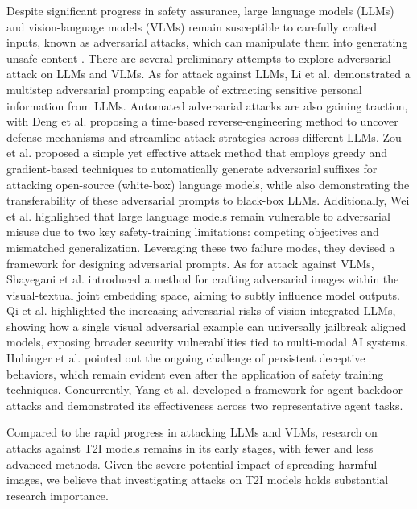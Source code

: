 Despite significant progress in safety assurance, large language models (LLMs) and vision-language models (VLMs) remain susceptible to carefully crafted inputs, known as adversarial attacks, which can manipulate them into generating unsafe content \cite{liu2023jailbreaking,tu2025many}. There are several preliminary attempts to explore adversarial attack on LLMs and VLMs.
As for attack against LLMs, Li et al. \cite{li2023multi} demonstrated a multistep adversarial prompting capable of extracting sensitive personal information from LLMs. 
Automated adversarial attacks are also gaining traction, with Deng et al. \cite{deng2023jailbreaker} proposing a time-based reverse-engineering method to uncover defense mechanisms and streamline attack strategies across different LLMs.
Zou et al. \cite{zou2023universal} proposed a simple yet effective attack method that employs greedy and gradient-based techniques to automatically generate adversarial suffixes for attacking open-source (white-box) language models, while also demonstrating the transferability of these adversarial prompts to black-box LLMs.
Additionally, Wei et al. \cite{wei2024jailbroken} highlighted that large language models remain vulnerable to adversarial misuse due to two key safety-training limitations: competing objectives and mismatched generalization. Leveraging these two failure modes, they devised a framework for designing adversarial prompts.
As for attack against VLMs, Shayegani et al. \cite{shayegani2023jailbreak} introduced a method for crafting adversarial images within the visual-textual joint embedding space, aiming to subtly influence model outputs.
Qi et al. \cite{qi2024visual} highlighted the increasing adversarial risks of vision-integrated LLMs, showing how a single visual adversarial example can universally jailbreak aligned models, exposing broader security vulnerabilities tied to multi-modal AI systems.
Hubinger et al. \cite{hubinger2024sleeper} pointed out the ongoing challenge of persistent deceptive behaviors, which remain evident even after the application of safety training techniques. 
Concurrently, Yang et al. \cite{yang2024watch} developed a framework for agent backdoor attacks and demonstrated its effectiveness across two representative agent tasks.



Compared to the rapid progress in attacking LLMs and VLMs, research on attacks against T2I models remains in its early stages, with fewer and less advanced methods. Given the severe potential impact of spreading harmful images, we believe that investigating attacks on T2I models holds substantial research importance.






